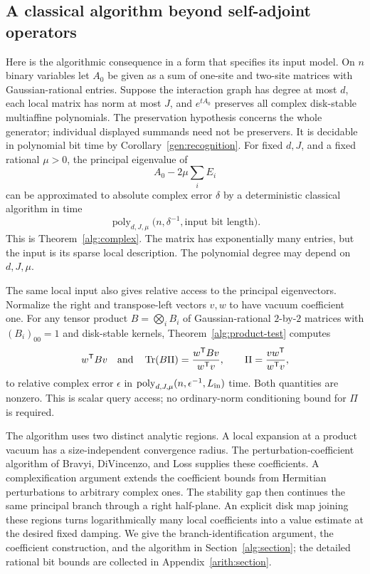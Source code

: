 \documentclass[reqno]{amsart}
\theoremstyle{definition}
\theoremstyle{remark}
\DeclareMathOperator{\Tr}{Tr}
\begin{document}
\subsection{A classical algorithm beyond self-adjoint operators}

Here is the algorithmic consequence in a form that specifies its input
model. On $n$ binary variables let $A_0$ be given as a sum of one-site
and two-site matrices with Gaussian-rational entries. Suppose the
interaction graph has degree at most $d$, each local matrix has norm
at most $J$, and $e^{tA_0}$ preserves all complex disk-stable
multiaffine polynomials. The preservation hypothesis concerns the whole generator; individual
displayed summands need not be preservers. It is decidable in
polynomial bit time by Corollary~\ref{gen:recognition}.
For fixed $d,J$, and a fixed rational $\mu>0$, the principal eigenvalue of
\[
 A_0-2\mu\sum_iE_i
\]
can be approximated to absolute complex error $\delta$ by a deterministic
classical algorithm in time
\[
 \operatorname{poly}_{d,J,\mu}
       \bigl(n,\delta^{-1},\text{input bit length}\bigr).
\]
This is Theorem~\ref{alg:complex}. The matrix has exponentially many
entries, but the input is its sparse local description. The polynomial
degree may depend on $d,J,\mu$.

The same local input also gives relative access to the principal
eigenvectors. Normalize the right and transpose-left vectors $v,w$
to have vacuum coefficient one. For any tensor product $B=\bigotimes_iB_i$
of Gaussian-rational $2$-by-$2$ matrices with $(B_i)_{00}=1$ and
disk-stable kernels, Theorem~\ref{alg:product-test} computes
\[
 w^{\mathsf T}Bv
 \quad\hbox{and}\quad
 \Tr(B\Pi)=\frac{w^{\mathsf T}Bv}{w^{\mathsf T}v},
 \qquad \Pi=\frac{vw^{\mathsf T}}{w^{\mathsf T}v},
\]
to relative complex error $\epsilon$ in
$\operatorname{poly}_{d,J,\mu}(n,\epsilon^{-1},L_{\rm in})$ time.
Both quantities are nonzero. This is scalar query access; no
ordinary-norm conditioning bound for $\Pi$ is required.

The algorithm uses two distinct analytic regions. A local expansion
at a product vacuum has a size-independent convergence radius.
The perturbation-coefficient algorithm of Bravyi, DiVincenzo, and
Loss \cite{BDL08} supplies these coefficients. A complexification
argument extends the coefficient bounds from Hermitian perturbations
to arbitrary complex ones. The stability gap then continues the same
principal branch through a right half-plane. An explicit disk map
joining these regions turns logarithmically many local coefficients
into a value estimate at the desired fixed damping. We give the
branch-identification argument, the coefficient construction, and the
algorithm in Section~\ref{alg:section}; the detailed rational
bit bounds are collected in Appendix~\ref{arith:section}.
\end{document}

